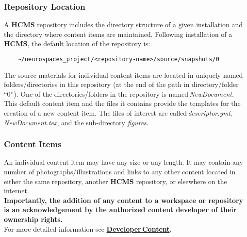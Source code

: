 \documentclass[12pt]{article}
\begin{document}
\subsubsection*{Repository Location}

A {\bf \small HCMS} repository includes the directory structure of a given installation and the directory where content items are maintained. Following installation of a {\bf \small HCMS}, the default location of the repository is:

\begin{verbatim}
    ~/neurospaces_project/<repository-name>/source/snapshots/0
\end{verbatim}
The source materials for individual content items are located in uniquely named folders/directories in this repository (at the end of the path in directory/folder ``0''). One of the directories/folders in the repository is named\,{\it NewDocument}. This default content item and the files it contains provide the templates for the creation of a new content item. The files of interest are called\,{\it descriptor.yml}, {\it NewDocument.tex}, and the sub-directory {\it figures}.

\subsubsection*{Content Items}

An individual content item may have any size or any length. It may contain any number of photographs/illustrations and links to any other content located in either the same repository, another {\bf \small HCMS} repository, or elsewhere on the internet.\\
{\bf Importantly, the addition of any content to a workspace or repository is an acknowledgement by the authorized content developer of their ownership rights.}\\
For more detailed information see \href{../developer-content/developer-content.tex}{\bf Developer\,Content}.



\end{document}
